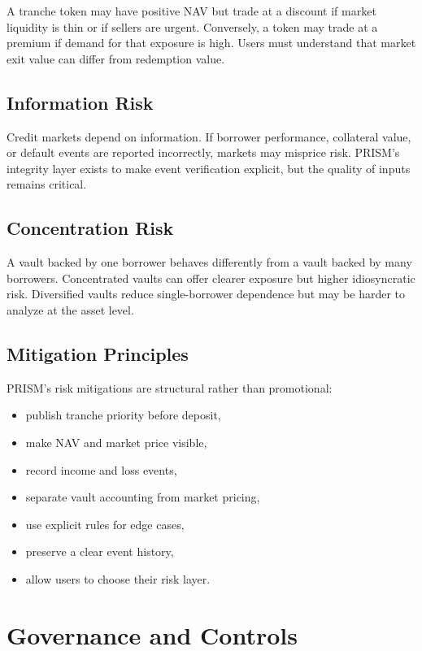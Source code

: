 \documentclass[11pt]{article}
\begin{document}
A tranche token may have positive NAV but trade at a discount if market
liquidity is thin or if sellers are urgent. Conversely, a token may trade at a
premium if demand for that exposure is high. Users must understand that market
exit value can differ from redemption value.

\subsection{Information Risk}

Credit markets depend on information. If borrower performance, collateral value,
or default events are reported incorrectly, markets may misprice risk. PRISM's
integrity layer exists to make event verification explicit, but the quality of
inputs remains critical.

\subsection{Concentration Risk}

A vault backed by one borrower behaves differently from a vault backed by many
borrowers. Concentrated vaults can offer clearer exposure but higher idiosyncratic
risk. Diversified vaults reduce single-borrower dependence but may be harder to
analyze at the asset level.

\subsection{Mitigation Principles}

PRISM's risk mitigations are structural rather than promotional:

\begin{itemize}
  \item publish tranche priority before deposit,
  \item make NAV and market price visible,
  \item record income and loss events,
  \item separate vault accounting from market pricing,
  \item use explicit rules for edge cases,
  \item preserve a clear event history,
  \item allow users to choose their risk layer.
\end{itemize}

\section{Governance and Controls}
\end{document}
